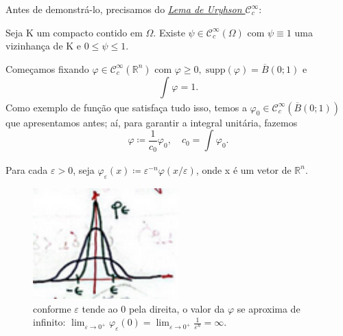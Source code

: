 \documentclass[../distribution_theory_notes.tex]{subfiles}
\begin{document}
Antes de demonstrá-lo, precisamos do \hyperlink{uryhson_lemma}{\textit{Lema de Uryhson \(\mathcal{C}_{c}^{\infty}\)}}:
\hypertarget{uryhson_lemma}{
	\begin{theorem*}
		Seja K um compacto contido em \(\Omega \). Existe \(\psi \in \mathcal{C}_{c}^{\infty}(\Omega )\) com \(\psi \equiv 1\) uma vizinhança de K e \(0\leq \psi \leq 1\).
	\end{theorem*}
}
\begin{proof*}
	Começamos fixando \(\varphi \in \mathcal{C}_{c}^{\infty}(\mathbb{R}^{n})\) com \(\varphi \geq 0,\; \mathrm{supp}(\varphi )=\overline{B}(0;1)\) e
	\[
		\int_{}^{}\varphi = 1.
	\]
	Como exemplo de função que satisfaça tudo isso, temos a \(\varphi_{0}\in \mathcal{C}_{c}^{\infty}(\overline{B}(0;1))\) que apresentamos antes; aí, para garantir a integral unitária, fazemos
	\[
		\varphi \coloneqq \frac{1}{c_{0}}\varphi_{0},\quad c_{0}= \int_{}^{}\varphi_{0}.
	\]

	Para cada \(\varepsilon >0\), seja \(\varphi_{\varepsilon }(x)\coloneqq \varepsilon^{-n}\varphi(x/\varepsilon )\), onde x é um vetor de \(\mathbb{R}^{n}\).
	\begin{figure}[H]
		\begin{center}
			\includegraphics[height=0.5\textheight, width=0.5\textwidth, keepaspectratio]{./Images/phi_epsilon_09.png}
		\end{center}
		\caption{conforme \(\varepsilon \) tende ao 0 pela direita, o valor da \(\varphi \) se aproxima de infinito: \(\lim_{\varepsilon \to 0^{+}}\varphi_{\varepsilon }(0)=\lim_{\varepsilon \to 0^{+}}\frac{1}{\varepsilon^{n}}=\infty.\)}
	\end{figure}


\end{proof*}
\end{document}
